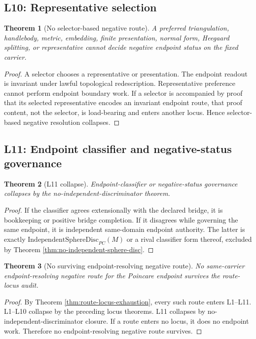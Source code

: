 \documentclass[11pt]{article}
\newtheorem{theorem}{Theorem}[section]
\newcommand{\IndependentSphereDisc}{\mathrm{IndependentSphereDisc}_{PC}}
\begin{document}
\subsection{L10: Representative selection}
\begin{theorem}[No selector-based negative route]
A preferred triangulation, handlebody, metric, embedding, finite presentation, normal form, Heegaard splitting, or representative cannot decide negative endpoint status on the fixed carrier.
\end{theorem}
\begin{proof}
A selector chooses a representative or presentation. The endpoint readout is invariant under lawful topological redescription. Representative preference cannot perform endpoint boundary work. If a selector is accompanied by proof that its selected representative encodes an invariant endpoint route, that proof content, not the selector, is load-bearing and enters another locus. Hence selector-based negative resolution collapses.
\end{proof}

\subsection{L11: Endpoint classifier and negative-status governance}
\begin{theorem}[L11 collapse]
Endpoint-classifier or negative-status governance collapses by the no-independent-discriminator theorem.
\end{theorem}
\begin{proof}
If the classifier agrees extensionally with the declared bridge, it is bookkeeping or positive bridge completion. If it disagrees while governing the same endpoint, it is independent same-domain endpoint authority. The latter is exactly \(\IndependentSphereDisc(M)\) or a rival classifier form thereof, excluded by Theorem \ref{thm:no-independent-sphere-disc}.
\end{proof}

\begin{theorem}[No surviving endpoint-resolving negative route]\label{thm:no-surviving-negative-route}
No same-carrier endpoint-resolving negative route for the Poincare endpoint survives the route-locus audit.
\end{theorem}
\begin{proof}
By Theorem \ref{thm:route-locus-exhaustion}, every such route enters L1--L11. L1--L10 collapse by the preceding locus theorems. L11 collapses by no-independent-discriminator closure. If a route enters no locus, it does no endpoint work. Therefore no endpoint-resolving negative route survives.
\end{proof}
\end{document}
